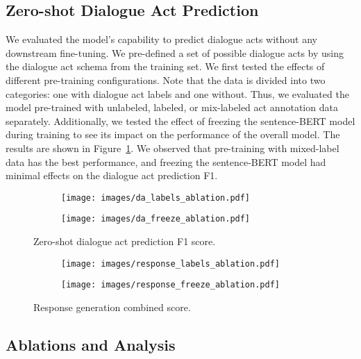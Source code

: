 \subsection{Zero-shot Dialogue Act Prediction}

We evaluated the model's capability to predict dialogue acts without any downstream fine-tuning. 
We pre-defined a set of possible dialogue acts by using the dialogue act schema from the training set.
We first tested the effects of different pre-training configurations.
Note that the data is divided into two categories: one with dialogue act labels and one without.
Thus, we evaluated the model pre-trained with unlabeled, labeled, or mix-labeled act annotation data separately.
Additionally, we tested the effect of freezing the sentence-BERT model during training to see its impact on the performance of the overall model.
The results are shown in Figure~\ref{fig:act_pred}.
We observed that pre-training with mixed-label data has the best performance, and freezing the sentence-BERT model had minimal effects on the dialogue act prediction F1.

\begin{figure}[t]
    \centering
    \begin{subfigure}[b]{0.34\textwidth}
    \texttt{[image: images/da\_labels\_ablation.pdf]}
    \end{subfigure}
    \begin{subfigure}[b]{0.3\textwidth}
    \texttt{[image: images/da\_freeze\_ablation.pdf]}
    \end{subfigure}
    \caption{Zero-shot dialogue act prediction F1 score.}
    \label{fig:act_pred}
\end{figure}

\begin{figure}[t]
    \centering
    \begin{subfigure}[b]{0.34\textwidth}
    \texttt{[image: images/response\_labels\_ablation.pdf]}
    \end{subfigure}
    \begin{subfigure}[b]{0.3\textwidth}
    \texttt{[image: images/response\_freeze\_ablation.pdf]}
    \end{subfigure}
    \caption{Response generation combined score.}
    \label{fig:ablations}
\end{figure}

\subsection{Ablations and Analysis}

